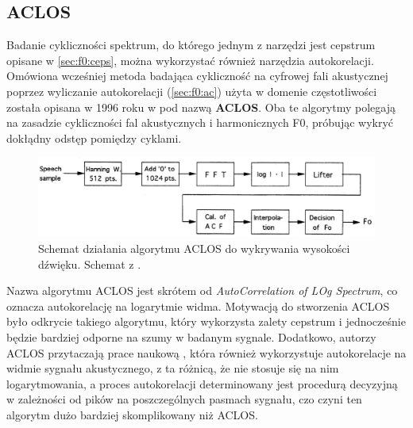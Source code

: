 \documentclass[12pt,a4paper,twoside]{mwart}
\begin{document}
\subsection{ACLOS}\label{sec:f0:aclos}
Badanie cykliczności spektrum, do którego jednym z narzędzi jest cepstrum opisane w \ref{sec:f0:ceps}, można wykorzystać również narzędzia autokorelacji. Omówiona wcześniej metoda badająca cykliczność na cyfrowej fali akustycznej poprzez wyliczanie autokorelacji (\ref{sec:f0:ac}) użyta w domenie częstotliwości została opisana w 1996 roku w \cite{Transcription:Kunieda:Aclos} pod nazwą \textbf{ACLOS}. Oba te algorytmy polegają na zasadzie cykliczności fal akustycznych i harmonicznych F0, próbując wykryć dokłądny odstęp pomiędzy cyklami.

\begin{figure}[H]
  \begin{center}
    \includegraphics[scale=0.29]{images/ACLOS/ACLOS_flow.jpg}
    \caption{Schemat działania algorytmu ACLOS do wykrywania wysokości dźwięku. Schemat z \cite[233]{Transcription:Kunieda:Aclos}.}
    \label{fig:aclos:flow}
  \end{center}
\end{figure}

Nazwa algorytmu ACLOS jest skrótem od \textit{AutoCorrelation of LOg Spectrum}, co oznacza autokorelację na logarytmie widma. Motywacją do stworzenia ACLOS było odkrycie takiego algorytmu, który wykorzysta zalety cepstrum i jednocześnie będzie bardziej odporne na szumy w badanym sygnale. Dodatkowo, autorzy ACLOS przytaczają prace naukową \cite{Transcription:Lahat:SpectralAutocorrelationNoiseCorrupted}, która również wykorzystuje autokorelacje na widmie sygnału akustycznego, z ta różnicą, że nie stosuje się na nim logarytmowania, a proces autokorelacji determinowany jest procedurą decyzyjną w zależności od pików na poszczególnych pasmach sygnału, czo czyni ten algorytm dużo bardziej skomplikowany niż ACLOS.
\end{document}
